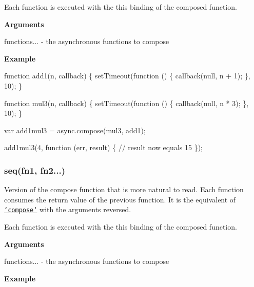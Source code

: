 Each function is executed with the {\ttfamily this} binding of the composed function.

{\bfseries Arguments}


\begin{DoxyItemize}
\item {\ttfamily functions...} -\/ the asynchronous functions to compose
\end{DoxyItemize}

{\bfseries Example}


\begin{DoxyCode}
\textcolor{keyword}{function} add1(n, callback) \{
    setTimeout(\textcolor{keyword}{function} () \{
        callback(null, n + 1);
    \}, 10);
\}

\textcolor{keyword}{function} mul3(n, callback) \{
    setTimeout(\textcolor{keyword}{function} () \{
        callback(null, n * 3);
    \}, 10);
\}

var add1mul3 = async.compose(mul3, add1);

add1mul3(4, \textcolor{keyword}{function} (err, result) \{
   \textcolor{comment}{// result now equals 15}
\});
\end{DoxyCode}
 

 \label{_seq}%
 \subsubsection*{seq(fn1, fn2...)}

Version of the compose function that is more natural to read. Each function consumes the return value of the previous function. It is the equivalent of \href{#compose}{\tt `compose`} with the arguments reversed.

Each function is executed with the {\ttfamily this} binding of the composed function.

{\bfseries Arguments}


\begin{DoxyItemize}
\item functions... -\/ the asynchronous functions to compose
\end{DoxyItemize}

{\bfseries Example}



